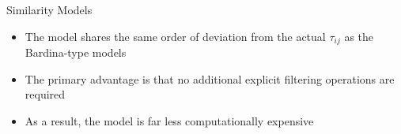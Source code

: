 
\begin{frame}{Similarity Models}
\begin{itemize}
	\item The model shares the same order of deviation from the actual $\tau_{ij}$ as the Bardina-type models
	\item The primary advantage is that no additional explicit filtering operations are required
	\item As a result, the model is far less computationally expensive
\end{itemize}

\end{frame}






